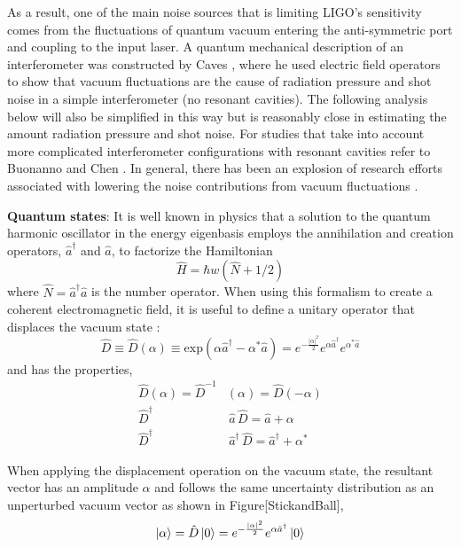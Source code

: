 		As a result, one of the main noise sources that is limiting LIGO's sensitivity comes from the fluctuations of quantum vacuum entering the anti-symmetric port and coupling to the input laser. A quantum mechanical description of an interferometer was constructed by Caves \cite{CavesQMNoise}\cite{Caves2photon} \cite{CavesOscillator}, where he used electric field operators to show that vacuum fluctuations are the cause of radiation pressure and shot noise in a simple interferometer (no resonant cavities).  The following analysis below will also be simplified in this way but is reasonably close in estimating the amount radiation pressure and shot noise.  For studies that take into account more complicated interferometer configurations with resonant cavities refer to Buonanno and Chen \cite{BuonannoChenQMNoise} \cite{ChenQND}.  In general, there has been an explosion of research efforts associated with lowering the noise contributions from vacuum fluctuations \cite{KimbleConversion}.
		
		\textbf{Quantum states}:
		It is well known in physics \cite{Shankar} \cite{Griffiths} that a solution to the quantum harmonic oscillator in the energy eigenbasis employs the annihilation and creation  operators, $\hat{a}^{\dagger}$ and $\hat{a}$, to factorize the Hamiltonian
		\begin{equation}
		\hat{H} = \hbar w (\hat{N} + 1/2)
		\end{equation} 
		where $\hat{N} = \hat{a}^{\dagger}  \hat{a}$ is the number operator.  When using this formalism to create a coherent electromagnetic field, it is useful to define a unitary operator that displaces the vacuum state \cite{GerryKnight}:
		\begin{equation}
		\hat{D} \equiv \hat{D}(\alpha) \equiv \text{exp}(\alpha \hat{a}^{\dagger} - \alpha^{*} \hat{a} ) = e^{-\frac{\vert{\alpha}\vert^2}{2}} e^{\alpha \hat{a}^{\dagger} } e^{\alpha^{*} \hat{a} }
		\end{equation}
		and has the properties,
		\begin{equation}
		\begin{aligned}
		\hat{D}(\alpha) = \hat{D}^{-1}&(\alpha) = \hat{D}(-\alpha)\\
		\hat{D}^\dagger&\, \hat{a} 		\,\hat{D}			= \hat{a} + \alpha \\ 
		\hat{D}^\dagger&\, \hat{a}^\dagger \,\hat{D} 		= \hat{a}^\dagger + \alpha^*
		\end{aligned}
		\end{equation}
		
		When applying the displacement operation on the vacuum state, the resultant vector has an amplitude $\alpha$ and follows the same uncertainty distribution as an unperturbed vacuum vector as shown in Figure[StickandBall],
		\begin{equation}
		\ket{\alpha} = \hat{D} \ket{0} =  e^{-\frac{\vert{\alpha}\vert^2}{2}} e^{\alpha \hat{a}^{\dagger} } \ket{0}
		\end{equation}
		
